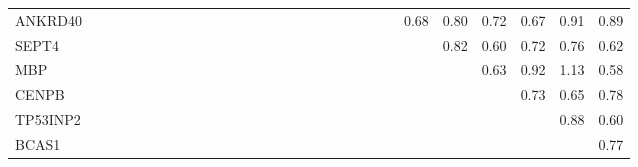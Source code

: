 \begin{longtable}{lrrrrrrrrrrrrrrrrrrrrrrrrrrrr}
ANKRD40  &              &              &            &            &            &            &              &               &            &            &             &             &             &              &             &                &            &            &             &                &             &               &        0.68 &      0.80 &        0.72 &           0.67 &        0.91 &        0.89 \\
SEPT4    &              &              &            &            &            &            &              &               &            &            &             &             &             &              &             &                &            &            &             &                &             &               &             &      0.82 &        0.60 &           0.72 &        0.76 &        0.62 \\
MBP      &              &              &            &            &            &            &              &               &            &            &             &             &             &              &             &                &            &            &             &                &             &               &             &           &        0.63 &           0.92 &        1.13 &        0.58 \\
CENPB    &              &              &            &            &            &            &              &               &            &            &             &             &             &              &             &                &            &            &             &                &             &               &             &           &             &           0.73 &        0.65 &        0.78 \\
TP53INP2 &              &              &            &            &            &            &              &               &            &            &             &             &             &              &             &                &            &            &             &                &             &               &             &           &             &                &        0.88 &        0.60 \\
BCAS1    &              &              &            &            &            &            &              &               &            &            &             &             &             &              &             &                &            &            &             &                &             &               &             &           &             &                &             &        0.77 \\
\end{longtable}


